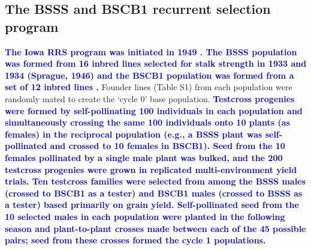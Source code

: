 \documentclass[twocolumn,twoside,letterpaper]{article}
\newcommand{\rev}[1]{\textcolor{blue}{\bf #1}}
\begin{document}
\subsection*{The BSSS and BSCB1 recurrent selection program}
\rev{The Iowa RRS program was initiated in 1949 \citep{penny1971twenty}. 
The BSSS population was formed from 16 inbred lines selected for stalk strength in 1933 and 1934 (Sprague, 1946) and the BSCB1 population was formed from a set of 12 inbred lines \citep{hallauer1974registration}.} 
Founder lines (Table S1) from each population were randomly mated to create the `cycle 0' base population.
\rev{Testcross progenies were formed by self-pollinating 100 individuals in each population and simultaneously crossing the same 100 individuals onto 10 plants (as females) in the reciprocal population (e.g., a BSSS plant was self-pollinated and crossed to 10 females in BSCB1).  
Seed from the 10 females pollinated by a single male plant was bulked, and the 200 testcross progenies were grown in replicated multi-environment yield trials.  
Ten testcross families were selected from among the BSSS males (crossed to BSCB1 as a tester) and BSCB1 males (crossed to BSSS as a tester) based primarily on grain yield.  
Self-pollinated seed from the 10 selected males in each population were planted in the following season and plant-to-plant crosses made between each of the 45 possible pairs; seed from these crosses formed the cycle 1 populations.}
\end{document}
